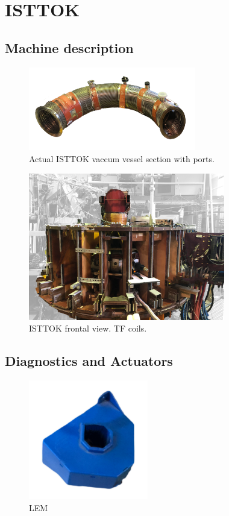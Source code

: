 \chapter{ISTTOK }

\section{Machine description}


\begin{figure}[htbp]
	\centering
	\includegraphics[width=0.65\textwidth]{Chp4/VacuumVessel_Low.png}
	\caption{\label{VV_IST} Actual ISTTOK vaccum vessel section with ports.  }
\end{figure}

\begin{figure}[htbp]
	\centering
	\includegraphics[width=0.765\textwidth]{Chp4/FrontISTTOK.png}
	\caption{\label{ISTTOK_front}ISTTOK frontal view. TF coils.  }
\end{figure}


\section{Diagnostics and Actuators}

\begin{figure}[htbp]
	\centering
	\includegraphics[width=0.465\textwidth]{Chp4/LEM.png}
	\caption{\label{LEM} LEM }
\end{figure}

